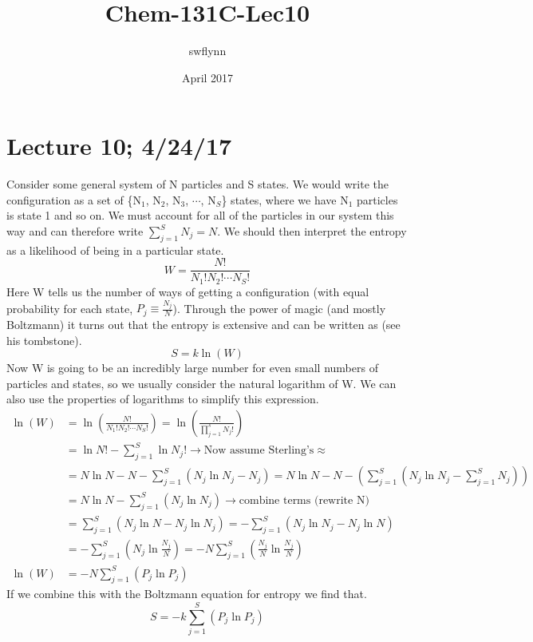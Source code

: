 \documentclass{article}
\title{Chem-131C-Lec10}
\author{swflynn }
\date{April 2017}
\begin{document}
\maketitle

\section*{Lecture 10; 4/24/17}
Consider some general system of N particles and S states.
We would write the configuration as a set of \{N$_1$, N$_2$, N$_3$, $\cdots$, N$_S$\} states, where we have N$_1$ particles is state 1 and so on.
We must account for all of the particles in our system this way and can therefore write $\displaystyle\sum_{j=1}^S N_j = N$.
We should then interpret the entropy as a likelihood of being in a particular state. 
\begin{equation}
    W = \frac{N!}{N_1!N_2!\cdots N_S!}
\end{equation}
Here W tells us the number of ways of getting a configuration (with equal probability for each state, $P_j \equiv \frac{N_j}{N}$). 
Through the power of magic (and mostly Boltzmann) it turns out that the entropy is extensive and can be written as (see his tombstone). 
\begin{equation}
    S = k\ln(W)
\end{equation}
Now W is going to be an incredibly large number for even small numbers of particles and states, so we usually consider the natural logarithm of W. 
We can also use the properties of logarithms to simplify this expression. 
\begin{equation}
\begin{split}
    \ln(W) &= \ln \left ( \frac{N!}{N_1!N_2!\cdots N_S!} \right ) =  \ln \left ( \frac{N!}{\displaystyle\prod_{j=1}^s N_j!} \right ) \\
    &= \ln N! - \sum_{j=1}^S \ln N_j! \rightarrow \text{Now assume Sterling's}\approx \\
    &= N\ln N - N - \sum_{j=1}^S (N_j \ln N_j - N_j) = N\ln N - N - \left (\sum_{j=1}^S (N_j \ln N_j - \sum_{j=1}^S N_j)\right) \\
    &=  N\ln N - \sum_{j=1}^S (N_j \ln N_j) \rightarrow \text{combine terms (rewrite N)} \\
    &= \sum_{j=1}^S \left( N_j\ln N - N_j\ln N_j \right) = -\sum_{j=1}^S \left( N_j\ln N_j - N_j\ln N \right) \\
    &= -\sum_{j=1}^S \left( N_j\ln \frac{N_j}{N}  \right) = -N\sum_{j=1}^S \left( \frac{N_j}{N}\ln \frac{N_j}{N}  \right) \\
    \ln (W) &= -N\sum_{j=1}^S \left( P_j\ln P_j  \right) 
\end{split}
\end{equation}
If we combine this with the Boltzmann equation for entropy we find that. 
\begin{equation}
     S = -k\sum_{j=1}^S \left( P_j\ln P_j  \right) 
\end{equation}
\end{document}
